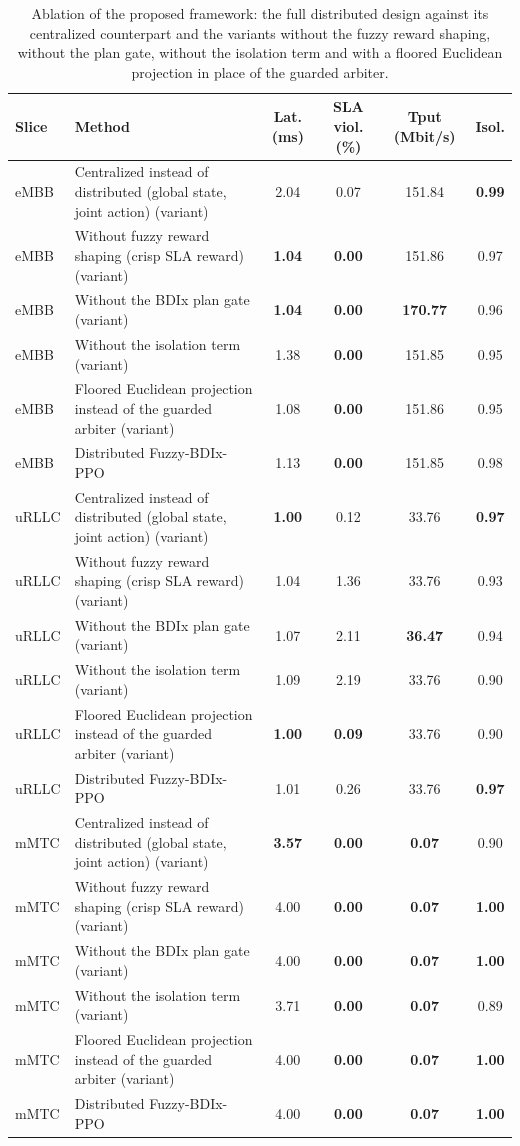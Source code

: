 \begin{table}[!t]
\centering
\caption{Ablation of the proposed framework: the full distributed design against its centralized counterpart and the variants without the fuzzy reward shaping, without the plan gate, without the isolation term and with a floored Euclidean projection in place of the guarded arbiter.}
\label{tab:incremental}
\footnotesize
\begin{tabular}{llcccc}
\toprule
\textbf{Slice} & \textbf{Method} & \textbf{Lat. (ms)} & \textbf{SLA viol. (\%)} & \textbf{Tput (Mbit/s)} & \textbf{Isol.} \\
\midrule
eMBB & Centralized instead of distributed (global state, joint action) (variant) & 2.04 & 0.07 & 151.84 & \textbf{0.99} \\
eMBB & Without fuzzy reward shaping (crisp SLA reward) (variant) & \textbf{1.04} & \textbf{0.00} & 151.86 & 0.97 \\
eMBB & Without the BDIx plan gate (variant) & \textbf{1.04} & \textbf{0.00} & \textbf{170.77} & 0.96 \\
eMBB & Without the isolation term (variant) & 1.38 & \textbf{0.00} & 151.85 & 0.95 \\
eMBB & Floored Euclidean projection instead of the guarded arbiter (variant) & 1.08 & \textbf{0.00} & 151.86 & 0.95 \\
eMBB & Distributed Fuzzy-BDIx-PPO & 1.13 & \textbf{0.00} & 151.85 & 0.98 \\
\midrule
uRLLC & Centralized instead of distributed (global state, joint action) (variant) & \textbf{1.00} & 0.12 & 33.76 & \textbf{0.97} \\
uRLLC & Without fuzzy reward shaping (crisp SLA reward) (variant) & 1.04 & 1.36 & 33.76 & 0.93 \\
uRLLC & Without the BDIx plan gate (variant) & 1.07 & 2.11 & \textbf{36.47} & 0.94 \\
uRLLC & Without the isolation term (variant) & 1.09 & 2.19 & 33.76 & 0.90 \\
uRLLC & Floored Euclidean projection instead of the guarded arbiter (variant) & \textbf{1.00} & \textbf{0.09} & 33.76 & 0.90 \\
uRLLC & Distributed Fuzzy-BDIx-PPO & 1.01 & 0.26 & 33.76 & \textbf{0.97} \\
\midrule
mMTC & Centralized instead of distributed (global state, joint action) (variant) & \textbf{3.57} & \textbf{0.00} & \textbf{0.07} & 0.90 \\
mMTC & Without fuzzy reward shaping (crisp SLA reward) (variant) & 4.00 & \textbf{0.00} & \textbf{0.07} & \textbf{1.00} \\
mMTC & Without the BDIx plan gate (variant) & 4.00 & \textbf{0.00} & \textbf{0.07} & \textbf{1.00} \\
mMTC & Without the isolation term (variant) & 3.71 & \textbf{0.00} & \textbf{0.07} & 0.89 \\
mMTC & Floored Euclidean projection instead of the guarded arbiter (variant) & 4.00 & \textbf{0.00} & \textbf{0.07} & \textbf{1.00} \\
mMTC & Distributed Fuzzy-BDIx-PPO & 4.00 & \textbf{0.00} & \textbf{0.07} & \textbf{1.00} \\
\bottomrule
\end{tabular}
\end{table}